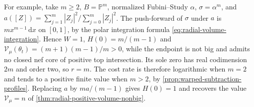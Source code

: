 For example, take $m\geq2$, $B=\mathbb P^m$, normalized Fubini--Study $\alpha$, $\sigma=\alpha^m$, and $a([Z])=\sum_{j=1}^m|Z_j|^2/\sum_{j=0}^m|Z_j|^2$. The push-forward of $\sigma$ under $a$ is $m x^{m-1}\,\mathrm{d}x$ on $[0,1]$, by the polar integration formula \eqref{eq:radial-volume-integration}. Hence $W=1$, $H(0)=m/(m-1)$ and $\mathcal V_\mu(\theta_t)=(m+1)(m-1)/m>0$, while the endpoint is not big and admits no closed nef core of positive top intersection. Its sole zero has real codimension $2m$ and order two, so $r=m$. The cost rate is therefore logarithmic when $m=2$ and tends to a positive finite value when $m>2$, by \cref{prop:warped-subtraction-profiles}. Replacing $a$ by $ma/(m-1)$ gives $H(0)=1$ and recovers the value $\mathcal V_\mu=n$ of \cref{thm:radial-positive-volume-nonbig}.
